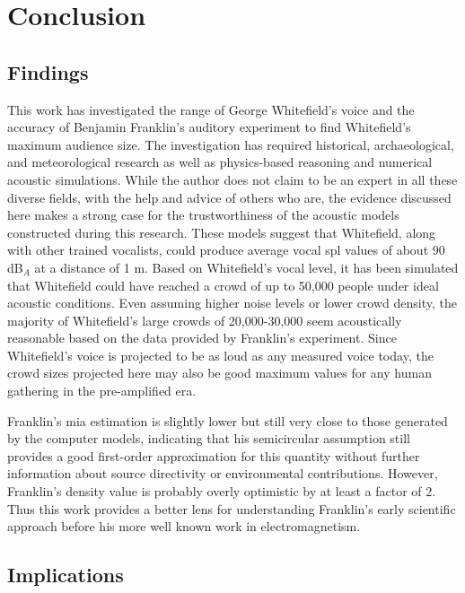 \graphicspath{{9/figures/}}
\chapter{Conclusion}
\label{chp:conclusion}

\section{Findings}

This work has investigated the range of George Whitefield's voice and the accuracy of Benjamin Franklin's auditory experiment to find Whitefield's maximum audience size. The investigation has required historical, archaeological, and meteorological research as well as physics-based reasoning and numerical acoustic simulations. While the author does not claim to be an expert in all these diverse fields, with the help and advice of others who are, the evidence discussed here makes a strong case for the trustworthiness of the acoustic models constructed during this research. These models suggest that Whitefield, along with other trained vocalists, could produce average vocal \gls{spl} values of about 90 dB$_A$ at a distance of 1 m. Based on Whitefield's vocal level, it has been simulated that Whitefield could have reached a crowd of up to 50,000 people under ideal acoustic conditions. Even assuming higher noise levels or lower crowd density, the majority of Whitefield's large crowds of 20,000-30,000 seem acoustically reasonable based on the data provided by Franklin's experiment. Since Whitefield's voice is projected to be as loud as any measured voice today, the crowd sizes projected here may also be good maximum values for any human gathering in the pre-amplified era.

Franklin's \gls{mia} estimation is slightly lower but still very close to those generated by the computer models, indicating that his semicircular assumption still provides a good first-order approximation for this quantity without further information about source directivity or environmental contributions. However, Franklin's density value is probably overly optimistic by at least a factor of 2. Thus this work provides a better lens for understanding Franklin's early scientific approach before his more well known work in electromagnetism. 

\section{Implications}

